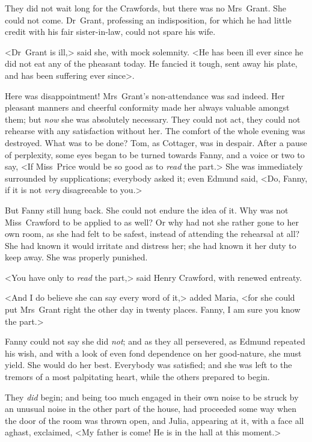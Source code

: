 They did not wait long for the Crawfords, but there was no Mrs~Grant. She could not come. Dr~Grant, professing an indisposition, for which he had little credit with his fair sister-in-law, could not spare his wife.

<Dr~Grant is ill,> said she, with mock solemnity. <He has been ill ever since he did not eat any of the pheasant today. He fancied it tough, sent away his plate, and has been suffering ever since>.

Here was disappointment! Mrs~Grant's non-attendance was sad indeed. Her pleasant manners and cheerful conformity made her always valuable amongst them; but \textit{now}  she was absolutely necessary. They could not act, they could not rehearse with any satisfaction without her. The comfort of the whole evening was destroyed. What was to be done? Tom, as Cottager, was in despair. After a pause of perplexity, some eyes began to be turned towards Fanny, and a voice or two to say, <If Miss~Price would be so good as to \textit{read}  the part.> She was immediately surrounded by supplications; everybody asked it; even Edmund said, <Do, Fanny, if it is not \textit{very}  disagreeable to you.>

But Fanny still hung back. She could not endure the idea of it. Why was not Miss~Crawford to be applied to as well? Or why had not she rather gone to her own room, as she had felt to be safest, instead of attending the rehearsal at all? She had known it would irritate and distress her; she had known it her duty to keep away. She was properly punished.

<You have only to \textit{read}  the part,> said Henry Crawford, with renewed entreaty.

<And I do believe she can say every word of it,> added Maria, <for she could put Mrs~Grant right the other day in twenty places. Fanny, I am sure you know the part.>

Fanny could not say she did \textit{not}; and as they all persevered, as Edmund repeated his wish, and with a look of even fond dependence on her good-nature, she must yield. She would do her best. Everybody was satisfied; and she was left to the tremors of a most palpitating heart, while the others prepared to begin.

They \textit{did}  begin; and being too much engaged in their own noise to be struck by an unusual noise in the other part of the house, had proceeded some way when the door of the room was thrown open, and Julia, appearing at it, with a face all aghast, exclaimed, <My father is come! He is in the hall at this moment.> 